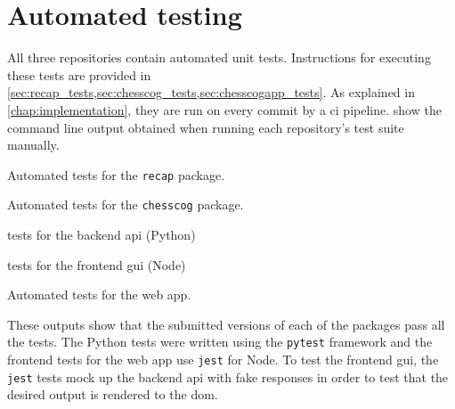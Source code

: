 \documentclass[../../report.tex]{subfiles}
\begin{document}
\section{Automated testing}
All three repositories contain automated unit tests.
Instructions for executing these tests are provided in \cref{sec:recap_tests,sec:chesscog_tests,sec:chesscogapp_tests}.
As explained in \cref{chap:implementation}, they are run on every commit by a \gls{ci} pipeline.
 show the command line output obtained when running each repository's test suite manually.
\begin{listing}
    
    \caption{Automated tests for the \texttt{recap} package.}
    \label{lst:tests_recap}
\end{listing}%
\begin{listing}
    
    \caption{Automated tests for the \texttt{chesscog} package.}
    \label{lst:tests_chesscog}
\end{listing}%
\begin{listing}
    \begin{sublisting}[b]{\textwidth}
        
        \caption{tests for the backend \acs{api} (Python)}
    \end{sublisting}
    \medskip\par
    \begin{sublisting}[b]{\textwidth}
        
        \caption{tests for the frontend \acs{gui} (Node)}
    \end{sublisting}
    \caption{Automated tests for the web app.}
    \label{lst:tests_chesscogapp}
\end{listing}%
These outputs show that the submitted versions of each of the packages pass all the tests.
The Python tests were written using the \texttt{pytest} framework and the frontend tests for the web app use \texttt{jest} for Node.
To test the frontend \gls{gui}, the \texttt{jest} tests mock up the backend \gls{api} with fake responses in order to test that the desired output is rendered to the \gls{dom}.
\end{document}
